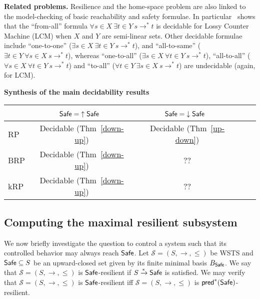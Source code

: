 {\bf Related problems.} 
Resilience and the home-space problem are also linked to the 
model-checking of basic reachability and safety formulae. 
In particular~\cite{DBLP:conf/rp/Schnoebelen10} shows that the ``from-all'' formula $\forall s \in X~ \exists t \in Y~ s \to^* t$
is decidable for Lossy Counter Machine (LCM)
when $X$ and $Y$ are semi-linear sets.
Other decidable formulae include ``one-to-one'' ($\exists s \in  X ~ \exists t \in  Y ~ s \to^* 
 t$), and ``all-to-same'' ($\exists t \in  Y ~ \forall s \in  X ~ s \to^*  t$),
whereas ``one-to-all'' ($\exists s \in  X ~ \forall t \in  Y ~ s \to^*  t$), 
``all-to-all'' ($\forall s \in  X ~ \forall t \in  Y ~ s \to^*  t$)
  and ``to-all'' ($\forall t \in  Y  ~ \exists s \in  X ~ s \to^*  t$) are undecidable (again, for LCM). 
  
  
  





{\bf Synthesis of the main decidability results}\label{synthesis}
\begin{center}
\begin{tabular}{ | l | c | c | c | r |}
\hline   \ %
		& $\textsf{Safe} = {\uparrow \textsf{Safe}}$~ 
		 & $\textsf{Safe} = {\downarrow \textsf{Safe}}$~ 
 \\ \hline
   RP %
   	& Decidable (Thm~\ref{down-up})  
   		 & Decidable (Thm~\ref{up-down}) 
    \\ \hline
   BRP %
   &  Decidable (Thm~\ref{down-up}) 
   		 & ?? 
    \\ \hline
      kRP %
      & Decidable (Thm~\ref{down-up}) 
      		& ?? 
       \\ \hline
 \end{tabular}
\end{center}


\subsection{Computing the maximal resilient subsystem}

We now briefly investigate the question to control a system such that its controlled behavior may always reach $\textsf{Safe}$.
%
Let $\mathscr{S}=(S, \rightarrow, \leq)$ be WSTS and $\textsf{Safe} \subseteq S$ be an upward-closed set given by its finite minimal basis $B_{\textsf{Safe}}$. 
%
We say that $\mathscr{S}=(S, \rightarrow, \leq)$ is $\textsf{Safe}$-resilient if $S  \xrightarrow{*} \textsf{Safe}$ is satisfied.  
%
We may verify that  $\mathscr{S}=(S, \rightarrow, \leq)$ is $\textsf{Safe}$-resilient iff  $\mathscr{S}=(S, \rightarrow, \leq)$ is $\textsf{pred}^*(\textsf{Safe})$-resilient. 

